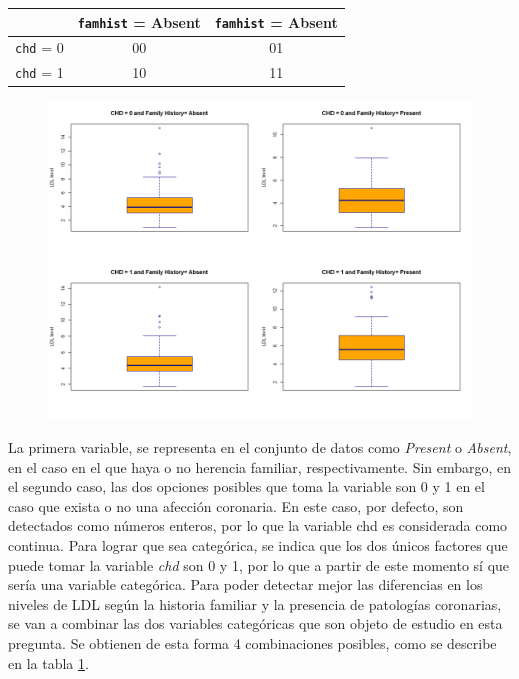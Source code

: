 \documentclass[a4paper, 9pt]{article}
\begin{document}
\begin{table}[H]
\centering
\begin{tabular}{c|cc}
                  & \texttt{famhist} = Absent & \texttt{famhist} = Absent  \\ \hline
\texttt{chd} = 0  & 00               & 01                \\
\texttt{chd} = 1  & 10               & 11               
\end{tabular}
\label{table:question2-combinations}
\end{table}

\begin{figure}
    \centering
    \includegraphics[scale=0.2]{images/question-2/plot1.png}
    \label{fig:question2-plot}
\end{figure}


La primera variable, se representa en el conjunto de datos como \textit{Present} o \textit{Absent}, en el caso en el que haya o no herencia familiar, respectivamente. Sin embargo, en el segundo caso, las dos opciones posibles que toma la variable son 0 y 1 en el caso que exista o no una afección coronaria. En este caso, por defecto, son detectados como números enteros, por lo que la variable chd es considerada como continua. Para lograr que sea categórica, se indica que los dos únicos factores que puede tomar la variable \textit{chd} son 0 y 1, por lo que a partir de este momento sí que sería una variable categórica. Para poder detectar mejor las diferencias en los niveles de LDL según la historia familiar y la presencia de patologías coronarias, se van a combinar las dos variables categóricas que son objeto de estudio en esta pregunta. Se obtienen de esta forma 4 combinaciones posibles, como se describe en la tabla \ref{table:question2-combinations}.
\end{document}
